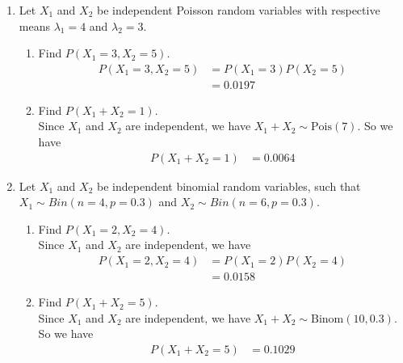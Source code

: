 \documentclass[12pt]{article} %
\newcommand{\Red}{\color{Red}}
\begin{document}
\begin{enumerate}
{$$\begin{aligned}
    &\geq 1 - \frac{4}{36} \\
    &= \frac{8}{9}
\end{aligned}$$}
\newpage
\item Let $X_{1}$ and $X_{2}$ be independent Poisson random variables with respective means $\lambda_1=4$ and $\lambda_2=3$. 
\begin{enumerate}
\item Find $P(X_1=3,X_2=5)$. \\ {\Red $$\begin{aligned}
    P(X_1 = 3, X_2 = 5) &= P(X_1 = 3) P(X_2 = 5) \\
    &= 0.0197
\end{aligned}$$}
\item Find $P(X_1+X_2=1)$. \\ {\Red Since $X_1$ and $X_2$ are independent, we have $X_1 + X_2 \sim \text{Pois}(7)$. So we have $$\begin{aligned}
    P(X_1 + X_2 = 1) &= 0.0064
\end{aligned}$$}
\end{enumerate}
\newpage
\item Let $X_{1}$ and $X_{2}$ be independent binomial random variables, such that $X_1\sim Bin(n=4, p=0.3)$ and $X_2\sim Bin(n=6, p=0.3)$.
\begin{enumerate}
\item Find $P(X_1=2,X_2=4)$. \\ {\Red Since $X_1$ and $X_2$ are independent, we have $$\begin{aligned}
    P(X_1 = 2, X_2 = 4) &= P(X_1 = 2) P(X_2 = 4) \\
    &= 0.0158
\end{aligned}$$}
\item Find $P(X_1+X_2=5)$. \\ {\Red Since $X_1$ and $X_2$ are independent, we have $X_1+X_2 \sim \text{Binom}(10, 0.3)$. So we have $$\begin{aligned}
    P(X_1 + X_2 = 5) &= 0.1029
\end{aligned}$$}
\end{enumerate}

\end{enumerate}


	


\end{document}
